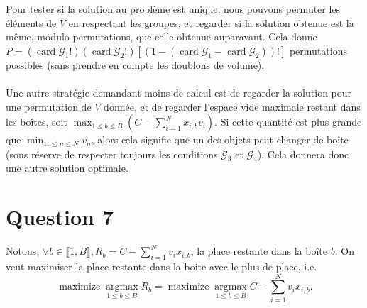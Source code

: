 Pour tester si la solution au problème est unique, nous pouvons permuter les éléments de $V$ en respectant les groupes, et regarder si la solution obtenue est la même, modulo permutations, que celle obtenue auparavant. Cela donne $P = (\operatorname{card}\mathcal{G}_1!) (\operatorname{card}\mathcal{G}_2!) [(1 - (\operatorname{card}\mathcal{G}_1 - \operatorname{card}\mathcal{G}_2))!]$ permutations possibles (sans prendre en compte les doublons de volume). \\ \\
Une autre stratégie demandant moins de calcul est de regarder la solution pour une permutation de $V$ donnée, et de regarder l'espace vide maximale restant dans les boîtes, soit $ \displaystyle \max_{1 \le b \le B}{(C - \sum_{i=1}^N x_{i, b} v_i)}$. Si cette quantité est plus grande que $\displaystyle \min_{1, \le n \le N}{v_n}$, alors cela signifie que un des objets peut changer de boîte (sous réserve de respecter toujours les conditions $\mathcal{G}_3$ et $\mathcal{G}_4$). Cela donnera donc une autre solution optimale.

\section{Question 7}

Notons, $\forall b \in \llbracket 1, B \rrbracket, R_b = C - \sum_{i=1}^Nv_i x_{i, b}$, la place restante dans la boîte $b$. On veut maximiser la place restante dans la boite avec le plus de place, i.e.
$$
\operatorname{maximize} \underset{1\le b \le B}{\operatorname{argmax}} R_b = \operatorname{maximize} \underset{1\le b \le B}{\operatorname{argmax}} C - \sum_{i=1}^Nv_i x_{i, b}.
$$

\newpage
